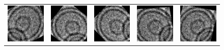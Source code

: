 \documentclass{beamer}
\begin{document}
\begin{frame}
\begin{figure}
\begin{tabular}{ccccc}
\includegraphics[scale=0.5]{augmented/_0_7140.jpeg} & \includegraphics[scale=0.5]{augmented/_0_7746.jpeg} & \includegraphics[scale=0.5]{augmented/_0_8553.jpeg} & \includegraphics[scale=0.5]{augmented/_0_8763.jpeg} & \includegraphics[scale=0.5]{augmented/_0_9361.jpeg} 
	
\end{tabular}
\end{figure}
\end{frame}

%
%
\end{document}
